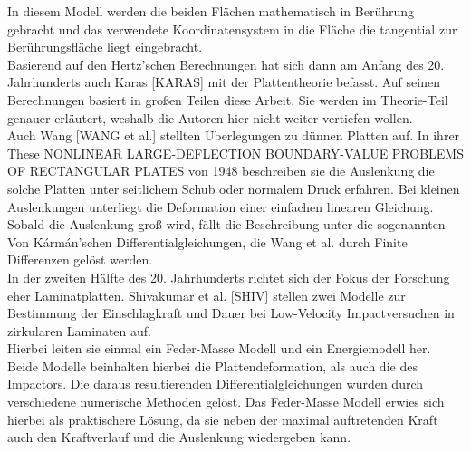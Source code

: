 In diesem Modell werden die beiden Flächen mathematisch in Berührung gebracht und das verwendete Koordinatensystem in die Fläche die tangential zur Berührungsfläche liegt eingebracht. \\


Basierend auf den Hertz'schen Berechnungen hat sich dann am Anfang des 20. Jahrhunderts auch Karas [KARAS] mit der Plattentheorie befasst. Auf seinen Berechnungen basiert in großen Teilen diese Arbeit. Sie werden im Theorie-Teil genauer erläutert, weshalb die Autoren hier nicht weiter vertiefen wollen.\\
Auch Wang [WANG et al.] stellten Überlegungen zu dünnen Platten auf. In ihrer These NONLINEAR LARGE-DEFLECTION BOUNDARY-VALUE PROBLEMS OF RECTANGULAR PLATES von 1948 beschreiben sie die Auslenkung die solche Platten unter seitlichem Schub oder normalem Druck erfahren. Bei kleinen Auslenkungen unterliegt die Deformation einer einfachen linearen Gleichung. Sobald die Auslenkung groß wird, fällt die Beschreibung unter die sogenannten Von Kármán'schen Differentialgleichungen, die Wang et al. durch Finite Differenzen gelöst werden.\\
In der zweiten Hälfte des 20. Jahrhunderts richtet sich der Fokus der Forschung eher Laminatplatten. Shivakumar et al. [SHIV] stellen zwei Modelle zur Bestimmung der Einschlagkraft und Dauer bei Low-Velocity Impactversuchen in zirkularen Laminaten auf. \\
Hierbei leiten sie einmal ein Feder-Masse Modell und ein Energiemodell her. \\
Beide Modelle beinhalten hierbei die Plattendeformation, als auch die des Impactors. Die daraus resultierenden Differentialgleichungen wurden durch verschiedene numerische Methoden gelöst. Das Feder-Masse Modell erwies sich hierbei als praktischere Lösung, da sie neben der maximal auftretenden Kraft auch den Kraftverlauf und die Auslenkung wiedergeben kann. \\


